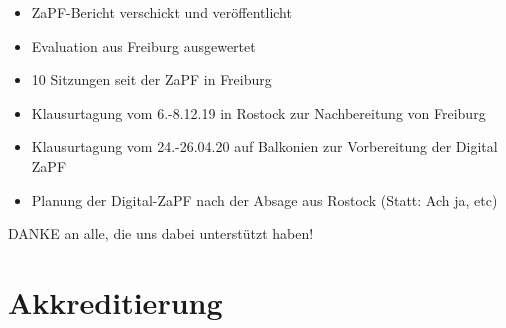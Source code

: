 \documentclass[compress, aspectratio=169]{beamer}
\begin{document}
\begin{frame}
  \begin{itemize}
    \item ZaPF-Bericht verschickt und veröffentlicht
    \item Evaluation aus Freiburg ausgewertet
    \item 10 Sitzungen seit der ZaPF in Freiburg
    \item Klausurtagung vom 6.-8.12.19 in Rostock zur Nachbereitung von Freiburg
    \item Klausurtagung vom 24.-26.04.20 auf Balkonien zur Vorbereitung der Digital ZaPF
    \item Planung der Digital-ZaPF nach der Absage aus Rostock (Statt: Ach ja, etc)
  \end{itemize}
  \vspace{5mm}
  \begin{center}
    \Large DANKE an alle, die uns dabei unterstützt haben!
  \end{center}
\end{frame}




\section{Akkreditierung}
\end{document}
